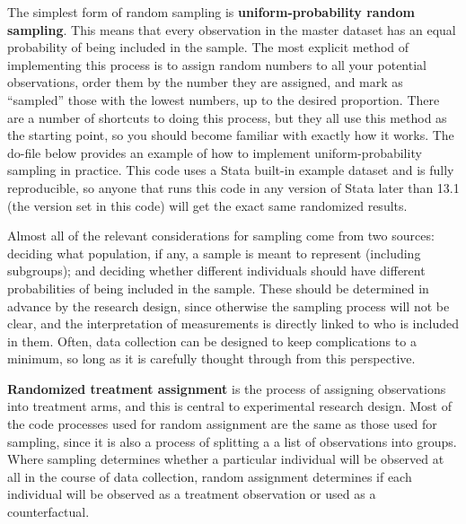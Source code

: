 The simplest form of random sampling is \textbf{uniform-probability random sampling}.
This means that every observation in the master dataset
has an equal probability of being included in the sample.
The most explicit method of implementing this process
is to assign random numbers to all your potential observations,
order them by the number they are assigned,
and mark as ``sampled'' those with the lowest numbers, up to the desired proportion.
There are a number of shortcuts to doing this process,
but they all use this method as the starting point,
so you should become familiar with exactly how it works.
The do-file below provides an example of
how to implement uniform-probability sampling in practice.
This code uses a Stata built-in example dataset and is fully reproducible,
so anyone that runs this code in any version of Stata later than 13.1
(the version set in this code)
will get the exact same randomized results.


Almost all of the relevant considerations for sampling come from two sources:
deciding what population, if any, a sample is meant to represent (including subgroups);
and deciding whether different individuals should have different probabilities
of being included in the sample.
These should be determined in advance by the research design,
since otherwise the sampling process will not be clear,
and the interpretation of measurements is directly linked to who is included in them.
Often, data collection can be designed to keep complications to a minimum,
so long as it is carefully thought through from this perspective.


\textbf{Randomized treatment assignment} is the process of assigning observations into treatment arms,
and this is central to experimental research design.
Most of the code processes used for random assignment are the same as those used for sampling,
since it is also a process of splitting a a list of observations into groups.
Where sampling determines whether a particular individual
will be observed at all in the course of data collection,
random assignment determines if each individual will be observed
as a treatment observation or used as a counterfactual.


